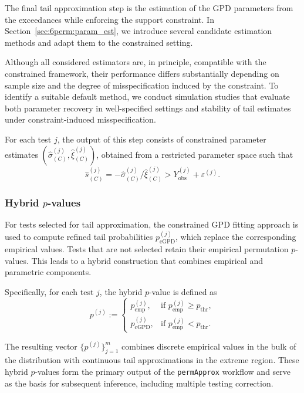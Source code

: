 The final tail approximation step is the estimation of the GPD parameters from the exceedances while enforcing the support constraint. In Section~\ref{sec:6perm:param_est}, we introduce several candidate estimation methods and adapt them to the constrained setting.

Although all considered estimators are, in principle, compatible with the constrained framework, their performance differs substantially depending on sample size and the degree of misspecification induced by the constraint. To identify a suitable default method, we conduct simulation studies that evaluate both parameter recovery in well-specified settings and stability of tail estimates under constraint-induced misspecification.

For each test $j$, the output of this step consists of constrained parameter estimates $(\hat{\sigma}^{(j)}_{(C)}, \hat{\xi}^{(j)}_{(C)})$, obtained from a restricted parameter space such that
\begin{equation}
\hat{s}^{(j)}_{(C)} = -\hat{\sigma}^{(j)}_{(C)} / \hat{\xi}^{(j)}_{(C)} > Y_{\mathrm{obs}}^{(j)} + \varepsilon^{(j)}.
\end{equation}

\subsubsection*{Hybrid \texorpdfstring{$p$}{p}-values}

For tests selected for tail approximation, the constrained GPD fitting approach is used to compute refined tail probabilities $p_{\mathrm{cGPD}}^{(j)}$, which replace the corresponding empirical values. Tests that are not selected retain their empirical permutation $p$-values. This leads to a hybrid construction that combines empirical and parametric components.

Specifically, for each test $j$, the hybrid $p$-value is defined as
\begin{equation}
\label{eq:6perm:hybrid_pvalue}
p^{(j)} :=
\begin{cases}
p_{\mathrm{emp}}^{(j)}, & \text{if } p_{\mathrm{emp}}^{(j)} \ge p_{\mathrm{thr}}, \\[6pt]
p_{\mathrm{cGPD}}^{(j)}, & \text{if } p_{\mathrm{emp}}^{(j)} < p_{\mathrm{thr}}.
\end{cases}
\end{equation}

The resulting vector $\{p^{(j)}\}_{j=1}^m$ combines discrete empirical values in the bulk of the distribution with continuous tail approximations in the extreme region. These hybrid $p$-values form the primary output of the \texttt{permApprox} workflow and serve as the basis for subsequent inference, including multiple testing correction.


